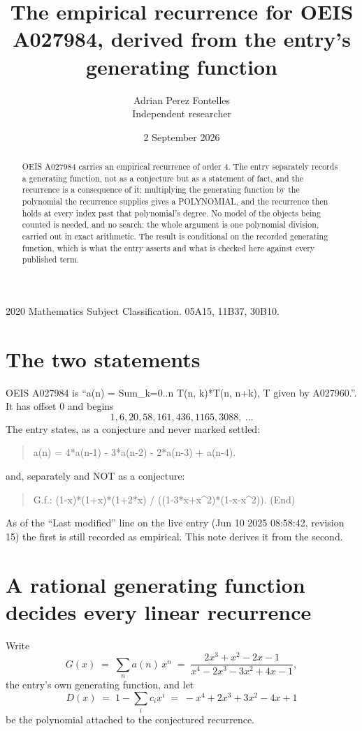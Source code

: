 \documentclass[11pt,a4paper]{article}
\title{The empirical recurrence for OEIS A027984, derived from the entry's generating function}
\author{Adrian Perez Fontelles\\ \small Independent researcher}
\date{2 September 2026}
\theoremstyle{plain}
\theoremstyle{definition}
\begin{document}
\maketitle

\begin{abstract}
OEIS A027984 carries an empirical recurrence of order $4$. The entry separately records a
generating function, not as a conjecture but as a statement of fact, and the recurrence is a
consequence of it: multiplying the generating function by the polynomial the recurrence
supplies gives a POLYNOMIAL, and the recurrence then holds at every index past that
polynomial's degree. No model of the objects being counted is needed, and no search: the
whole argument is one polynomial division, carried out in exact arithmetic. The result is
conditional on the recorded generating function, which is what the entry asserts and what is
checked here against every published term.
\end{abstract}

\noindent\small 2020 Mathematics Subject Classification. 05A15, 11B37, 30B10.\normalsize

\section{The two statements}

OEIS A027984 is ``a(n) = Sum\_{k=0..n} T(n, k)*T(n, n+k), T given by A027960.''. It has offset $0$ and begins
\[
1, 6, 20, 58, 161, 436, 1165, 3088,\ \dots
\]
The entry states, as a conjecture and never marked settled:
\begin{quote}
a(n) = 4*a(n-1) - 3*a(n-2) - 2*a(n-3) + a(n-4).
\end{quote}
and, separately and NOT as a conjecture:
\begin{quote}
G.f.: (1-x)*(1+x)*(1+2*x) / ((1-3*x+x\^{}2)*(1-x-x\^{}2)). (End)
\end{quote}
As of the ``Last modified'' line on the live entry (Jun 10 2025 08:58:42, revision 15) the first is still
recorded as empirical. This note derives it from the second.

\section{A rational generating function decides every linear recurrence}

Write
\[
G(x)\;=\;\sum_{n}a(n)\,x^{n}\;=\;\frac{2 x^{3} + x^{2} - 2 x - 1}{x^{4} - 2 x^{3} - 3 x^{2} + 4 x - 1},
\]
the entry's own generating function, and let
\[
D(x)\;=\;1-\sum_i c_i x^{i}\;=\;- x^{4} + 2 x^{3} + 3 x^{2} - 4 x + 1
\]
be the polynomial attached to the conjectured recurrence.
\end{document}
